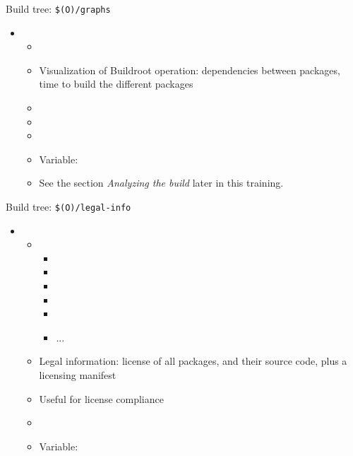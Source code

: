 \begin{frame}{Build tree: {\tt \$(O)/graphs}}
  \begin{itemize}
  \item {}
    \begin{itemize}
    \item {}
    \item Visualization of Buildroot operation: dependencies between
      packages, time to build the different packages
    \item {}
    \item {}
    \item {}
    \item Variable: 
    \item See the section {\em Analyzing the build} later in this
      training.
    \end{itemize}
  \end{itemize}
\end{frame}

\begin{frame}{Build tree: {\tt \$(O)/legal-info}}
  \begin{itemize}
  \item {}
    \begin{itemize}
    \item {}
      \begin{itemize}
        \scriptsize
      \item {}
      \item {}
      \item {}
      \item {}
      \item {}
      \item ...
      \end{itemize}
    \item Legal information: license of all packages, and their
      source code, plus a licensing manifest
    \item Useful for license compliance
    \item {}
    \item Variable: 
    \end{itemize}
  \end{itemize}
\end{frame}
